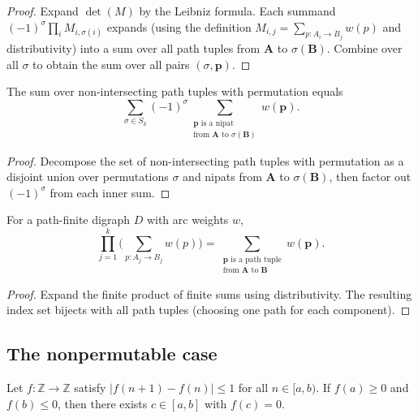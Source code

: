 \begin{proof}
Expand $\det(M)$ by the Leibniz formula.  Each summand
$(-1)^\sigma \prod_i M_{i,\sigma(i)}$ expands (using the definition
$M_{i,j} = \sum_{p : A_i \to B_j} w(p)$ and distributivity) into
a sum over all path tuples from $\mathbf{A}$ to $\sigma(\mathbf{B})$.
Combine over all $\sigma$ to obtain the sum over
all pairs $(\sigma, \mathbf{p})$.
\end{proof}

\begin{lemma}
\label{lem.lgv.sum-nipat-eq}
\leanhelper
\leanok
The sum over non-intersecting path tuples with permutation equals
\[
  \sum_{\sigma \in S_k} (-1)^\sigma
  \sum_{\substack{\mathbf{p} \text{ is a nipat} \\ \text{from } \mathbf{A} \text{ to } \sigma(\mathbf{B})}}
  w(\mathbf{p}).
\]
\end{lemma}

\begin{proof}
\leanok
Decompose the set of non-intersecting path tuples with permutation as a disjoint union over
permutations $\sigma$ and nipats from $\mathbf{A}$ to $\sigma(\mathbf{B})$,
then factor out $(-1)^\sigma$ from each inner sum.
\end{proof}

\begin{lemma}
\label{lem.lgv.prod-pathWeightSum}
\leanhelper
\leanok
For a path-finite digraph $D$ with arc weights $w$,
\[
  \prod_{j=1}^{k} \biggl(\sum_{p : A_j \to B_j} w(p)\biggr)
  = \sum_{\substack{\mathbf{p} \text{ is a path tuple} \\ \text{from } \mathbf{A} \text{ to } \mathbf{B}}}
    w(\mathbf{p}).
\]
\end{lemma}

\begin{proof}
Expand the finite product of finite sums using distributivity.
The resulting index set bijects with all path tuples (choosing one
path for each component).
\end{proof}

\subsection{The nonpermutable case}

\begin{lemma}
\label{lem.lgv.discrete-ivt}
\leanhelper
\leanok
Let $f : \mathbb{Z} \to \mathbb{Z}$ satisfy $|f(n+1) - f(n)| \le 1$
for all $n \in [a, b)$.  If $f(a) \ge 0$ and $f(b) \le 0$, then
there exists $c \in [a, b]$ with $f(c) = 0$.
\end{lemma}

